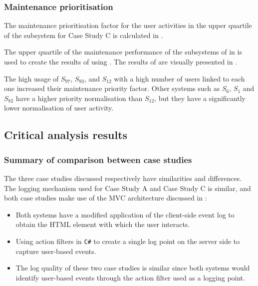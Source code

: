 \subsubsection{Maintenance prioritisation}
The maintenance prioritisation factor for the user activities in the upper quartile of the subsystem for Case Study C is calculated in .



The upper quartile of the maintenance performance of the subsystems of  in  is used to create the results of  using . The results of  are visually presented in .\par The high usage of $S_{97}$, $S_{93}$, and $S_{12}$ with a high number of users linked to each one increased their maintenance priority factor. Other systems such as $S_{6}$, $S_{1}$ and $S_{82}$ have a higher priority normalisation than $S_{12}$, but they have a significantly lower normalisation of user activity.

\subsection{Critical analysis results}\label{sec:ch3_criticalAnalysis}

\subsubsection{Summary of comparison between case studies}
The three case studies discussed respectively  have similarities and differences. The logging mechanism used for Case Study A and Case Study C is similar, and both case studies make use of the MVC architecture discussed in :

\begin{itemize}
	\item Both systems have a modified application of the  client-side event log to obtain the HTML element with which the user interacts.
	\item Using action filters in \texttt{C\#} to create a single log point on the server side to capture user-based events. 
	\item The log quality of these two case studies is similar since both systems would identify user-based events through the action filter used as a logging point.
\end{itemize}

